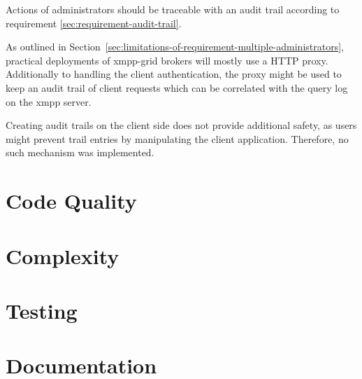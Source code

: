 Actions of administrators should be traceable with an audit trail according to requirement \ref{sec:requirement-audit-trail}.

As outlined in Section~\ref{sec:limitations-of-requirement-multiple-administrators}, practical deployments of \gls{xmpp-grid} \glspl{broker} will mostly use a HTTP proxy.
Additionally to handling the client authentication, the proxy might be used to keep an audit trail of client requests which can be correlated with the query log on the \gls{xmpp} server.

Creating audit trails on the client side does not provide additional safety, as users might prevent trail entries by manipulating the client application. Therefore, no such mechanism was implemented.



\section{Code Quality}


\section{Complexity}
\section{Testing}


\section{Documentation}

